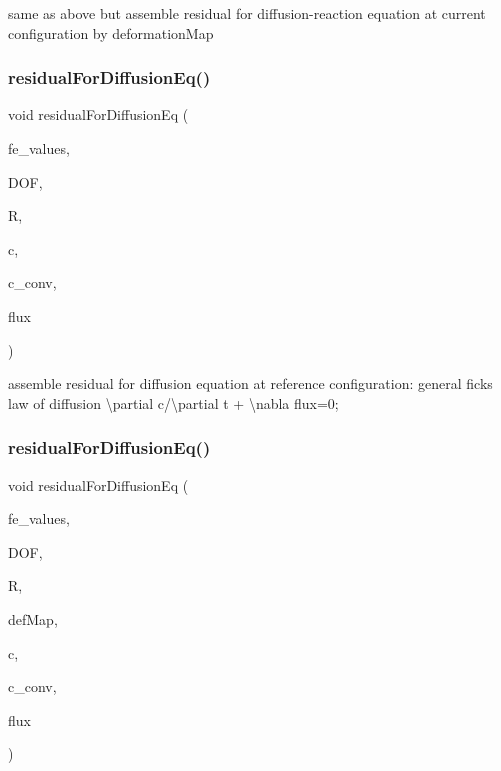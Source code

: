 same as above but assemble residual for diffusion-\/reaction equation at current configuration by deformation\+Map \mbox{\label{class_residual_a224462af849f5a1927bc90eb3795f2f2}} 
\subsubsection{\texorpdfstring{residualForDiffusionEq()}{residualForDiffusionEq()}\hspace{0.1cm}{\footnotesize\ttfamily [1/2]}}
{\footnotesize\ttfamily void residual\+For\+Diffusion\+Eq (\begin{DoxyParamCaption}\item[{const F\+E\+Values$<$ dim $>$ \&}]{fe\+\_\+values,  }\item[{unsigned int}]{D\+OF,  }\item[{dealii\+::\+Table$<$ 1, T $>$ \&}]{R,  }\item[{dealii\+::\+Table$<$ 1, T $>$ \&}]{c,  }\item[{dealii\+::\+Table$<$ 1, double $>$ \&}]{c\+\_\+conv,  }\item[{dealii\+::\+Table$<$ 2, T $>$ \&}]{flux }\end{DoxyParamCaption})}

assemble residual for diffusion equation at reference configuration\+: general fick\textquotesingle{}s law of diffusion \textbackslash{}partial c/\textbackslash{}partial t + \textbackslash{}nabla flux=0; \mbox{\label{class_residual_a69b8ab1cc85ae177f9c627b60b1b8468}} 
\subsubsection{\texorpdfstring{residualForDiffusionEq()}{residualForDiffusionEq()}\hspace{0.1cm}{\footnotesize\ttfamily [2/2]}}
{\footnotesize\ttfamily void residual\+For\+Diffusion\+Eq (\begin{DoxyParamCaption}\item[{const F\+E\+Values$<$ dim $>$ \&}]{fe\+\_\+values,  }\item[{unsigned int}]{D\+OF,  }\item[{dealii\+::\+Table$<$ 1, T $>$ \&}]{R,  }\item[{\mbox{\hyperlink{structdeformation_map}{deformation\+Map}}$<$ T, dim $>$ \&}]{def\+Map,  }\item[{dealii\+::\+Table$<$ 1, T $>$ \&}]{c,  }\item[{dealii\+::\+Table$<$ 1, double $>$ \&}]{c\+\_\+conv,  }\item[{dealii\+::\+Table$<$ 2, T $>$ \&}]{flux }\end{DoxyParamCaption})}

